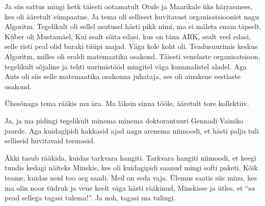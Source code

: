 Ja siis sattus mingi hetk täiesti ootamatult Otule ja 
Maarikale üks härrasmees, kes oli ääretult sümpaatne. 
Ja tema oli sellisest huvitavast organisatsioonist nagu Algoritm.  Tegelikult  
oli sellel asutusel hästi pikk nimi, ma ei mäleta enam 
täpselt. Küber oli Mustamäel, Kui sealt sõita edasi, kus on 
täna ARK, sealt veel edasi, selle risti peal olid baraki tüüpi 
majad. Väga  kole koht oli. 
Teadusuurimis keskus Algoritm, milles oli eraldi matemaatika osakond. Täiesti 
venelaste organisatsioon, tegelikult sõjaline ja tehti uurimistööd mingitel 
väga kummalistel aladel. Aga Ants oli siis selle matemaatika osakonna 
juhataja, see oli ainukene eestlaste osakond. 

Ühesõnaga tema rääkis mu ära. Ma läksin sinna tööle,  ääretult tore kollektiiv. 


Ja, ja ma pidingi tegelikult minema minema doktorantuuri Gennadi 
Vainiko juurde. Aga kuidagipidi  hakkasid ajad 
nagu arenema niimoodi, et hästi palju tuli selliseid huvitavaid teemasid. 

Äkki tasub  rääkida, kuidas tarkvara hangiti. Tarkvara hangiti niimoodi, et 
keegi tundis kedagi näiteks Minskis, kes oli kuidagipidi saanud mingi softi 
paketi. Kõik teame, kuidas neid too aeg saadi. Meil on seda vaja. Ülemus saatis 
siis minu, kes ma olin  noor tüdruk ja vene keelt väga hästi rääkinud, 
Minskisse ja ütles, et \enquote{sa pead sellega tagasi tulema!}. Ja noh, tagasi 
ma tulingi. 

